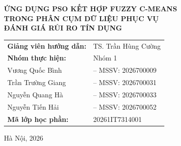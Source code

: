\begin{titlepage}
\begin{center}
{\fontsize{16pt}{20pt}\selectfont\bfseries ỨNG DỤNG PSO KẾT HỢP FUZZY C-MEANS\\[0.1cm]
TRONG PHÂN CỤM DỮ LIỆU PHỤC VỤ\\[0.1cm]
ĐÁNH GIÁ RỦI RO TÍN DỤNG\\[2.5cm]}

\begin{flushleft}
\hspace{2.5cm}
\begin{tabular}{ll}
\textbf{Giảng viên hướng dẫn:} & TS. Trần Hùng Cường \\[0.4cm]
\textbf{Nhóm thực hiện:} & Nhóm 1 \\
\quad Vương Quốc Bình & -- MSSV: 2026700009 \\
\quad Trần Trường Giang & -- MSSV: 2026700031 \\
\quad Nguyễn Quang Hà & -- MSSV: 2026700033 \\
\quad Nguyễn Tiến Hải & -- MSSV: 2026700052 \\[0.4cm]
\textbf{Mã lớp học phần:} & 20261IT7314001 \\
\end{tabular}
\end{flushleft}

\vfill

{\normalsize Hà Nội, 2026}

\end{center}
\end{titlepage}
